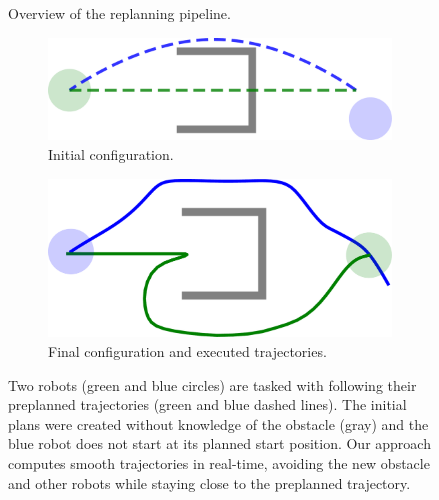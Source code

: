 \documentclass{svproc}
\begin{document}
\begin{figure}
{
}
\caption{Overview of the replanning pipeline.
}
\label{fig:flowchart}
\end{figure}

\begin{figure}
\centering
\begin{subfigure}[t]{0.45\textwidth}
\centering
\includegraphics[width=.9\textwidth]{images/swap2_initial.pdf}
\caption{Initial configuration.}
\label{fig:swap2:initial}
\end{subfigure} \hfill
\begin{subfigure}[t]{0.45\textwidth}
\centering
\includegraphics[width=.9\textwidth]{images/swap2_final.pdf}
\caption{Final configuration and executed trajectories.}
\label{fig:swap2:final}
\end{subfigure}
\caption{Two robots (green and blue circles) are tasked with following their preplanned trajectories (green and blue dashed lines).
The initial plans were created without knowledge of the obstacle (gray) and the blue robot does not start at its planned start position.
Our approach computes smooth trajectories in real-time, avoiding the new obstacle and other robots while staying close to the preplanned trajectory.
}
\label{fig:swap2}
\end{figure}
\end{document}
